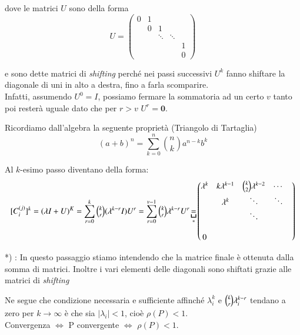 \begin{thproof}
dove le matrici $U$ sono della forma
$$ U =
\begin{pmatrix}
0           & 1           &             &             &                               \\
            & 0           & 1           &             &                               \\
            &             & \ddots      & \ddots      &                               \\
            &             &             &             & 1                             \\
            &             &             &             & 0
\end{pmatrix} $$

e sono dette matrici di \emph{shifting} perch\'e nei passi successivi
$U^k$ fanno shiftare la diagonale di uni in alto a destra, fino a
farla scomparire. \\
Infatti, assumendo $U^0 = I$, possiamo fermare la sommatoria ad un
certo $v$ tanto poi rester\`a uguale dato che per $r>v$
$U^r = \mathbf{0}$.\\
\begin{notes}
Ricordiamo dall'algebra la seguente propriet\`a (Triangolo di Tartaglia)
$$(a+b)^n = \sum_{k=0}^n {n \choose k}a^{n-k}b^{k} $$
\end{notes}
Al $k$-esimo passo diventano della forma:
\[[C_{i}^{(j)}]^{k} = (\lambda I + U)^{K} = 
\sum_{r=0}^{k} \tbinom kr (\lambda^{k-r} I) U^r = 
\sum_{r=0}^{v-1} \tbinom kr \lambda^{k-r} U^r \underbracket{=}_{*} 
\begin{pmatrix}
\lambda^k & k \lambda^{k-1} & \tbinom k2 \lambda^{k-2} & \cdots & \\
          & \lambda^k       & \ddots                   & \ddots & \\
          &                 & \ddots                   &        & \\
          &                 &                          &        & \\
0         &                 &                          &        & \\
\end{pmatrix}\] 
\begin{notes}
 *) : In questo passaggio stiamo intendendo che la matrice
 finale \`e ottenuta dalla somma di matrici. Inoltre i vari elementi
delle diagonali sono shiftati grazie alle matrici di \emph{shifting}
\end{notes}

Ne segue che condizione necessaria e sufficiente affinch\'e
$\lambda^{k}_i$ e $\tbinom kr \lambda^{k-r}_i$ tendano a zero per $k
\to \infty$ \`e che sia $|\lambda_i|<1$, cio\`e $\rho(P)<1$.\\
Convergenza $\Longleftrightarrow$ P convergente $\Longleftrightarrow$
$\rho(P) <1$.
\end{thproof}

